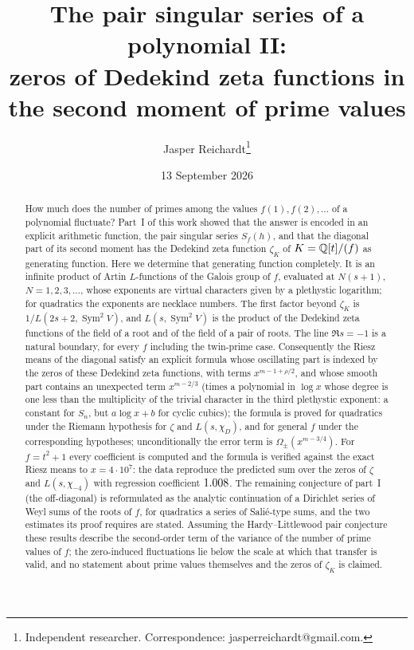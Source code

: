 \documentclass[11pt,a4paper]{article}
\title{The pair singular series of a polynomial II:\\ zeros of Dedekind zeta functions in the second
moment of prime values}
\author{Jasper Reichardt\thanks{Independent researcher. Correspondence: jasperreichardt@gmail.com.}}
\date{13 September 2026}
\theoremstyle{remark}\newtheorem{remark}[theorem]{Remark}
\newcommand{\Sym}{\operatorname{Sym}}\newcommand{\Res}{\operatorname*{Res}}
\begin{document}
\maketitle

\begin{abstract}
How much does the number of primes among the values $f(1),f(2),\dots$ of a polynomial fluctuate? Part~I
of this work showed that the answer is encoded in an explicit arithmetic function, the pair singular
series $S_f(h)$, and that the diagonal part of its second moment has the Dedekind zeta function
$\zeta_K$ of $K=\mathbb{Q}[t]/(f)$ as generating function. Here we determine that generating function completely.
It is an infinite product of Artin $L$-functions of the Galois group of $f$, evaluated at $N(s+1)$,
$N=1,2,3,\dots$, whose exponents are virtual characters given by a plethystic logarithm; for quadratics the
exponents are necklace numbers. The first factor beyond $\zeta_K$ is $1/L(2s+2,\Sym^2V)$, and $L(s,\Sym^2V)$ is
the product of the Dedekind zeta functions of the field of a root and of the field of a pair of roots. The
line $\Re s=-1$ is a natural boundary, for every $f$ including the twin-prime case. Consequently the Riesz
means of the diagonal satisfy an explicit formula whose oscillating part is indexed by the zeros of these
Dedekind zeta functions, with terms $x^{m-1+\rho/2}$, and whose smooth part contains an unexpected term
$x^{m-2/3}$ (times a polynomial in $\log x$ whose degree is one less than the multiplicity of the trivial
character in the third plethystic exponent: a constant for $S_n$, but $a\log x+b$ for cyclic cubics); the formula is proved for quadratics under the Riemann hypothesis for $\zeta$ and $L(s,\chi_D)$,
and for general $f$ under the corresponding hypotheses; unconditionally the error term is
$\Omega_\pm(x^{m-3/4})$. For $f=t^2+1$ every coefficient is computed and the formula is verified against the
exact Riesz means to $x=4\cdot10^7$: the data reproduce the predicted sum over the zeros of $\zeta$ and
$L(s,\chi_{-4})$ with regression coefficient $1.008$. The remaining conjecture of part~I (the off-diagonal)
is reformulated as the analytic continuation of a Dirichlet series of Weyl sums of the roots of $f$, for
quadratics a series of Sali\'e-type sums, and the two estimates its proof requires are stated. Assuming the
Hardy--Littlewood pair conjecture these results describe the second-order term of the variance of the number
of prime values of $f$; the zero-induced fluctuations lie below the scale at which that transfer is valid,
and no statement about prime values themselves and the zeros of $\zeta_K$ is claimed.
\end{abstract}
\end{document}
